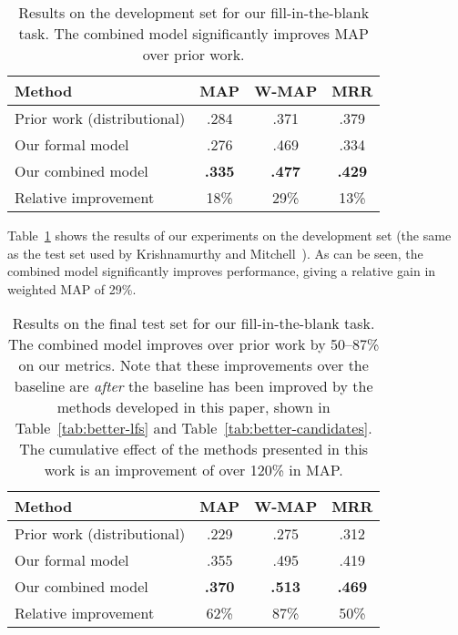 \documentclass[11pt]{article}
\newcommand{\tabref}[1]{Table~\ref{tab:#1}}
\begin{document}
\begin{table}
  \centering
  {\small
    \begin{tabular}{lccc}
      \toprule
      Method & MAP & W-MAP & MRR \\
      \midrule
      Prior work (distributional) & .284 & .371 & .379 \\
      \midrule
      Our formal model & .276 & .469 & .334 \\
      \midrule
      Our combined model & \textbf{.335} & \textbf{.477} & \textbf{.429} \\
      \bottomrule
      Relative improvement & 18\% & 29\% & 13\% \\
      \bottomrule
    \end{tabular}
  }
  \caption{Results on the development set for our fill-in-the-blank task.  The
  combined model significantly improves MAP over prior work.}
  \label{tab:dev-results}
\end{table}

\tabref{dev-results} shows the results of our experiments on the
development set (the same as the test set used by Krishnamurthy and
Mitchell~).  As
can be seen, the combined model significantly improves performance,
giving a relative gain in weighted MAP of 29\%.

\begin{table}
  \centering
  {\small
    \begin{tabular}{lccc}
      \toprule
      Method & MAP & W-MAP & MRR \\
      \midrule
      Prior work (distributional) & .229 & .275 & .312 \\
      \midrule
      Our formal model & .355 & .495 & .419 \\
      \midrule
      Our combined model & \textbf{.370} & \textbf{.513} & \textbf{.469} \\
      \bottomrule
      Relative improvement & 62\% & 87\% & 50\% \\
      \bottomrule
    \end{tabular}
  }
  \caption{Results on the final test set for our fill-in-the-blank
  task.  The combined model improves over prior work by 50--87\% on
  our metrics.  Note that these improvements over the baseline are
  \emph{after} the baseline has been improved by the methods developed
  in this paper, shown in \tabref{better-lfs} and
  \tabref{better-candidates}.  The cumulative effect of the methods
  presented in this work is an improvement of over 120\% in MAP.}
  \label{tab:final-results}
\end{table}
\end{document}
